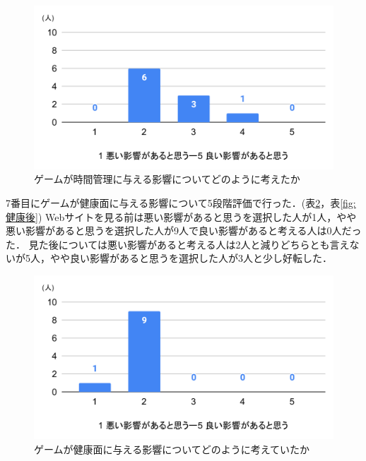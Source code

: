 \documentclass[12pt,a4j,titlepage]{ltjsarticle}
\begin{document}
\begin{figure}[H]
 \begin{center}
  \includegraphics[keepaspectratio, scale=0.5]{時間後.pdf}
 \end{center}
 \caption{ゲームが時間管理に与える影響についてどのように考えたか}
 \label{fig:時間後}
\end{figure}

7番目にゲームが健康面に与える影響について5段階評価で行った．(表\ref{fig:健康前}，表\ref{fig:健康後})
Webサイトを見る前は悪い影響があると思うを選択した人が1人，やや悪い影響があると思うを選択した人が9人で良い影響があると考える人は0人だった．
見た後については悪い影響があると考える人は2人と減りどちらとも言えないが5人，やや良い影響があると思うを選択した人が3人と少し好転した．

\begin{figure}[H]
 \begin{center}
  \includegraphics[keepaspectratio, scale=0.5]{健康前.pdf}
 \end{center}
 \caption{ゲームが健康面に与える影響についてどのように考えていたか}
 \label{fig:健康前}
\end{figure}
\end{document}
